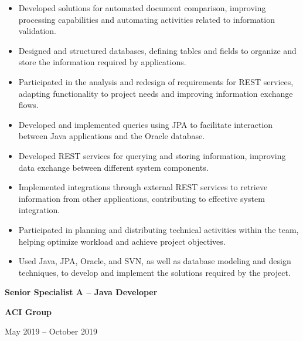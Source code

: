 \documentclass[10pt,letterpaper]{article}
\newcommand{\jobtitle}[1]{
    {\bfseries #1}
}
\newcommand{\company}[1]{
    {\bfseries\color{DarkGray} #1}
}
\newcommand{\jobdate}[1]{
    {\color{MediumGray} #1}
}
\begin{document}
\begin{itemize}

    \item Developed solutions for automated document comparison, improving processing capabilities and automating activities related to information validation.

    \item Designed and structured databases, defining tables and fields to organize and store the information required by applications.

    \item Participated in the analysis and redesign of requirements for REST services, adapting functionality to project needs and improving information exchange flows.

    \item Developed and implemented queries using JPA to facilitate interaction between Java applications and the Oracle database.

    \item Developed REST services for querying and storing information, improving data exchange between different system components.

    \item Implemented integrations through external REST services to retrieve information from other applications, contributing to effective system integration.

    \item Participated in planning and distributing technical activities within the team, helping optimize workload and achieve project objectives.

    \item Used Java, JPA, Oracle, and SVN, as well as database modeling and design techniques, to develop and implement the solutions required by the project.

\end{itemize}


\jobtitle{Senior Specialist A -- Java Developer} \textbar{}
\company{ACI Group}
\hfill \textbar{}
\jobdate{May 2019 -- October 2019}
\end{document}
